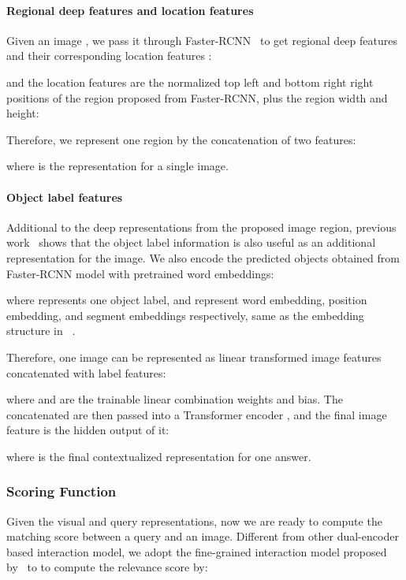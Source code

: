 \documentclass[11pt,a4paper]{article}
\begin{document}
\paragraph{Regional deep features and location features} 
Given an image , we pass it through Faster-RCNN~\cite{ren2016faster} to get  regional deep features  and their corresponding location features :

and the location features are the normalized top left and bottom right right positions of the region proposed from Faster-RCNN, plus the region width and height:

Therefore, we represent one region by the concatenation of two features:

where  is the representation for a single image. 

\paragraph{Object label features}
Additional to the deep representations from the proposed image region, previous work~\cite{li2020oscar} shows that the object label information is also useful as an additional representation for the image. We also encode the predicted objects obtained from Faster-RCNN model with pretrained word embeddings:

where  represents one object label, and  represent word embedding, position embedding, and segment embeddings respectively, same as the embedding structure in ~\citet{devlin2018bert}. 



Therefore, one image can be represented as linear transformed image features concatenated with label features:

where  and  are the trainable linear combination weights and bias. The concatenated  are then passed into a Transformer encoder , and the final image feature is the hidden output of it:

where  is the final contextualized representation for one answer.

\subsubsection{Scoring Function}
Given the visual and query representations, now we are ready to compute the matching score between a query and an image. Different from other dual-encoder based interaction model, we adopt the fine-grained interaction model proposed by~\cite{zhao2020sparta} to to compute the relevance score by:
\end{document}
